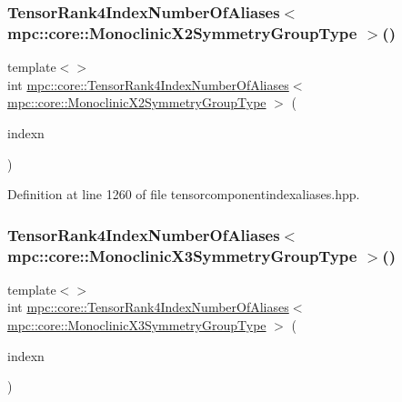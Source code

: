 \subsubsection{\texorpdfstring{Tensor\+Rank4\+Index\+Number\+Of\+Aliases$<$ mpc\+::core\+::\+Monoclinic\+X2\+Symmetry\+Group\+Type $>$()}{TensorRank4IndexNumberOfAliases< mpc::core::MonoclinicX2SymmetryGroupType >()}}
{\footnotesize\ttfamily template$<$$>$ \\
int \mbox{\hyperlink{namespacempc_1_1core_a8d98ed039053b282c6ce8cff2fad214c}{mpc\+::core\+::\+Tensor\+Rank4\+Index\+Number\+Of\+Aliases}}$<$ \mbox{\hyperlink{structmpc_1_1core_1_1_monoclinic_x2_symmetry_group_type}{mpc\+::core\+::\+Monoclinic\+X2\+Symmetry\+Group\+Type}} $>$ (\begin{DoxyParamCaption}\item[{const \mbox{\hyperlink{classmpc_1_1core_1_1_tensor_rank_n_component_index}{mpc\+::core\+::\+Tensor\+Rank\+N\+Component\+Index}}$<$ 4 $>$ \&}]{indexn }\end{DoxyParamCaption})\hspace{0.3cm}{\ttfamily [inline]}}



Definition at line 1260 of file tensorcomponentindexaliases.\+hpp.

\mbox{\label{namespacempc_1_1core_a4db5d7be01597c4ca1e258d2dab27e81}} 
\subsubsection{\texorpdfstring{Tensor\+Rank4\+Index\+Number\+Of\+Aliases$<$ mpc\+::core\+::\+Monoclinic\+X3\+Symmetry\+Group\+Type $>$()}{TensorRank4IndexNumberOfAliases< mpc::core::MonoclinicX3SymmetryGroupType >()}}
{\footnotesize\ttfamily template$<$$>$ \\
int \mbox{\hyperlink{namespacempc_1_1core_a8d98ed039053b282c6ce8cff2fad214c}{mpc\+::core\+::\+Tensor\+Rank4\+Index\+Number\+Of\+Aliases}}$<$ \mbox{\hyperlink{structmpc_1_1core_1_1_monoclinic_x3_symmetry_group_type}{mpc\+::core\+::\+Monoclinic\+X3\+Symmetry\+Group\+Type}} $>$ (\begin{DoxyParamCaption}\item[{const \mbox{\hyperlink{classmpc_1_1core_1_1_tensor_rank_n_component_index}{mpc\+::core\+::\+Tensor\+Rank\+N\+Component\+Index}}$<$ 4 $>$ \&}]{indexn }\end{DoxyParamCaption})\hspace{0.3cm}{\ttfamily [inline]}}



